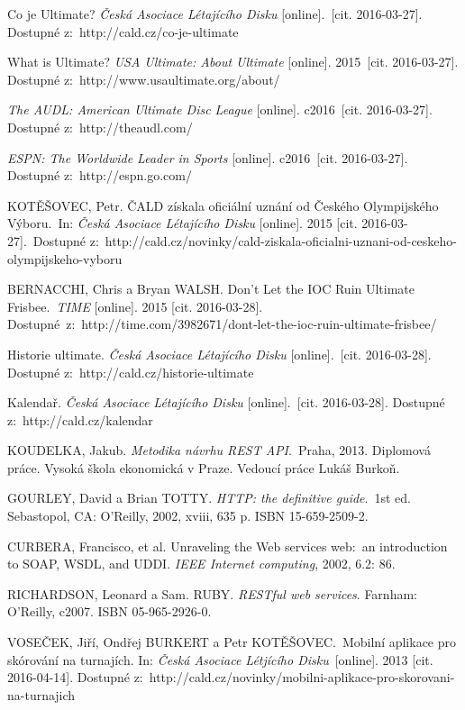 \begin{thebibliography}{1}

Co je Ultimate? \textit{Česká Asociace Létajícího Disku} [online].\
[cit. 2016-03-27]. Dostupné z:~http://cald.cz/co-je-ultimate

What is Ultimate? \textit{USA Ultimate: About Ultimate} [online]. 2015\
[cit. 2016-03-27]. Dostupné z:~http://www.usaultimate.org/about/

\bibitem{audl}
\textit{The AUDL: American Ultimate Disc League} [online]. c2016\
[cit. 2016-03-27]. Dostupné z:~http://theaudl.com/

\bibitem{espn}
\textit{ESPN: The Worldwide Leader in Sports} [online]. c2016\
[cit. 2016-03-27]. Dostupné z:~http://espn.go.com/

KOTĚŠOVEC, Petr. ČALD získala oficiální uznání od Českého Olympijského Výboru.\
In: \textit{Česká Asociace Létajícího Disku} [online]. 2015 [cit. 2016-03-27].\
Dostupné z:~http://cald.cz/novinky/cald-ziskala-oficialni-uznani-od-ceskeho-olympijskeho-vyboru

BERNACCHI, Chris a Bryan WALSH. Don’t Let the IOC Ruin Ultimate Frisbee.\
\textit{TIME} [online]. 2015 [cit. 2016-03-28]. Dostupné\
z:~http://time.com/3982671/dont-let-the-ioc-ruin-ultimate-frisbee/

\bibitem{cald_historie} Historie ultimate. \textit{Česká Asociace Létajícího Disku} [online].\
[cit. 2016-03-28]. Dostupné z:~http://cald.cz/historie-ultimate

 Kalendař. \textit{Česká Asociace Létajícího Disku} [online].\
[cit. 2016-03-28]. Dostupné z:~http://cald.cz/kalendar

\bibitem{rest_vse}
KOUDELKA, Jakub. \textit{Metodika návrhu REST API}.\
Praha, 2013. Diplomová práce. Vysoká škola ekonomická v Praze. Vedoucí práce Lukáš Burkoň.

GOURLEY, David a Brian TOTTY. \textit{HTTP: the definitive guide}.\
1st ed. Sebastopol, CA: O’Reilly, 2002, xviii, 635 p. ISBN 15-659-2509-2.

CURBERA, Francisco, et al. Unraveling the Web services web:\
an introduction to SOAP, WSDL, and UDDI. \textit{IEEE Internet computing}, 2002, 6.2: 86.

RICHARDSON, Leonard a Sam. RUBY. \textit{RESTful web services}. Farnham: O'Reilly, c2007. ISBN 05-965-2926-0.

\bibitem{cald_catcher}
VOSEČEK, Jiří, Ondřej BURKERT a Petr KOTĚŠOVEC.\
Mobilní aplikace pro skórování na turnajích. In: \textit{Česká Asociace Létjícího Disku}\
[online]. 2013 [cit. 2016-04-14]. Dostupné z:\
http://cald.cz/novinky/mobilni-aplikace-pro-skorovani-na-turnajich


\end{thebibliography}
